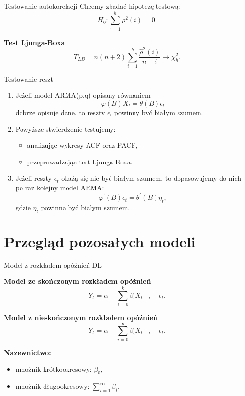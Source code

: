 \documentclass[a4paper, 11pt]{beamer}
\begin{document}
	\begin{frame}{Testowanie autokorelacji}
		Chcemy zbadać hipotezę testową: \[
			H_{0}: \sum_{i=1}^{h} \rho^{2}\left(i\right) = 0.
		\]
		\begin{block}{\textbf{Test Ljunga-Boxa}} \[
			T_{LB} = n \left(n + 2\right) \sum_{i=1}^{h}
				\frac{\hat{\rho}^{2}\left(i\right)}{n - i} \rightarrow \chi^{2}_{h}.
		\]
		\end{block}
	\end{frame}
	
	\begin{frame}{Testowanie reszt}
		\begin{enumerate}
			\item Jeżeli model ARMA(p,q) opisany równaniem \[
				\varphi\left(B\right)X_t = \theta\left(B\right)\epsilon_t
			\] dobrze opisuje dane, to reszty $\epsilon_t$ powinny
			być białym szumem.
			\item	Powyższe stwierdzenie testujemy:
			\begin{itemize}
				\item analizując wykresy ACF oraz PACF,
				\item przeprowadzając test Ljunga-Boxa.
			\end{itemize}
			\item Jeżeli reszty $\epsilon_t$ okażą się nie być białym szumem, to 
			dopasowujemy do nich po raz kolejny model ARMA: \[
				\varphi^{\prime}\left(B\right)\epsilon_t =
					\theta^{\prime}\left(B\right)\eta_t,
			\] gdzie $\eta_t$ powinna być białym szumem.
		\end{enumerate}
	\end{frame}
	
	\section{Przegląd pozosałych modeli}
	
	\begin{frame}{Model z rozkładem opóźnień DL}
		\begin{block}{\textbf{Model ze skończonym rozkładem opóźnień}} \[
				Y_{t} = \alpha + \sum_{i=0}^{k} \beta_{i} X_{t-i} + \epsilon_{t}.
			\]
		\end{block}
		\begin{block}{\textbf{Model z nieskończonym rozkładem opóźnień}} \[
				Y_{t} = \alpha + \sum_{i=0}^{\infty}
					\beta_{i} X_{t-i} + \epsilon_{t}.
			\]
		\end{block}
		\textbf{Nazewnictwo:}
		\begin{itemize}
			\item mnożnik krótkookresowy: $\beta_0,$
			\item mnożnik długookresowy: $\sum_{i=1}^{\infty}\beta_{i}.$
		\end{itemize}
	\end{frame}
	
\end{document}
